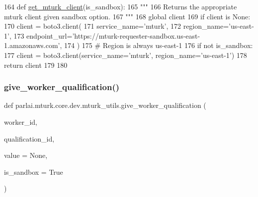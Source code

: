 \begin{DoxyCode}
164 \textcolor{keyword}{def }\hyperlink{namespaceparlai_1_1mturk_1_1core_1_1mturk__utils_a577e2527c04682284394b0951a090695}{get\_mturk\_client}(is\_sandbox):
165     \textcolor{stringliteral}{"""}
166 \textcolor{stringliteral}{    Returns the appropriate mturk client given sandbox option.}
167 \textcolor{stringliteral}{    """}
168     \textcolor{keyword}{global} client
169     \textcolor{keywordflow}{if} client \textcolor{keywordflow}{is} \textcolor{keywordtype}{None}:
170         client = boto3.client(
171             service\_name=\textcolor{stringliteral}{'mturk'},
172             region\_name=\textcolor{stringliteral}{'us-east-1'},
173             endpoint\_url=\textcolor{stringliteral}{'https://mturk-requester-sandbox.us-east-1.amazonaws.com'},
174         )
175         \textcolor{comment}{# Region is always us-east-1}
176         \textcolor{keywordflow}{if} \textcolor{keywordflow}{not} is\_sandbox:
177             client = boto3.client(service\_name=\textcolor{stringliteral}{'mturk'}, region\_name=\textcolor{stringliteral}{'us-east-1'})
178     \textcolor{keywordflow}{return} client
179 
180 
\end{DoxyCode}
\mbox{\label{namespaceparlai_1_1mturk_1_1core_1_1dev_1_1mturk__utils_a631fbce36ff4d09422f29513460bc744}} 
\subsubsection{\texorpdfstring{give\+\_\+worker\+\_\+qualification()}{give\_worker\_qualification()}}
{\footnotesize\ttfamily def parlai.\+mturk.\+core.\+dev.\+mturk\+\_\+utils.\+give\+\_\+worker\+\_\+qualification (\begin{DoxyParamCaption}\item[{}]{worker\+\_\+id,  }\item[{}]{qualification\+\_\+id,  }\item[{}]{value = {\ttfamily None},  }\item[{}]{is\+\_\+sandbox = {\ttfamily True} }\end{DoxyParamCaption})}

